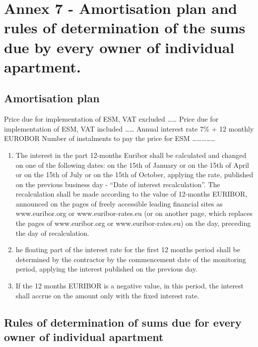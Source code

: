 \section{Annex 7 {-} Amortisation plan and rules of determination of the sums due by every owner of individual apartment.}

\subsection{Amortisation plan}

Price due for implementation of ESM, VAT excluded ……  Price due for
implementation of ESM, VAT included ……  Annual interest rate 7\% + 12
monthly EUROBOR Number of instalments to pay the price for ESM ……………


\begin{enumerate}
\item The interest in the part 12-months Euribor shall be calculated
  and changed on one of the following dates: on the 15th of January or
  on the 15th of April or on the 15th of July or on the 15th of
  October, applying the rate, published on the previous business day
  {-} “Date of interest recalculation”. The recalculation shall be
  made according to the value of 12-months EURIBOR, announced on the
  pages of freely accessible leading financial sites as
  www.euribor.org or www.euribor-rates.eu (or on another page, which
  replaces the pages of www.euribor.org or www.euribor-rates.eu) on
  the day, preceding the day of recalculation.
\item he floating part of the interest rate for the first 12 months
  period shall be determined by the contractor by the commencement
  date of the monitoring period, applying the interest published on
  the previous day.
\item If the 12 months EURIBOR is a negative value, in this period,
  the interest shall accrue on the amount only with the fixed interest
  rate.
\end{enumerate}

\subsection{Rules of determination of sums due for every owner of
  individual apartment}

